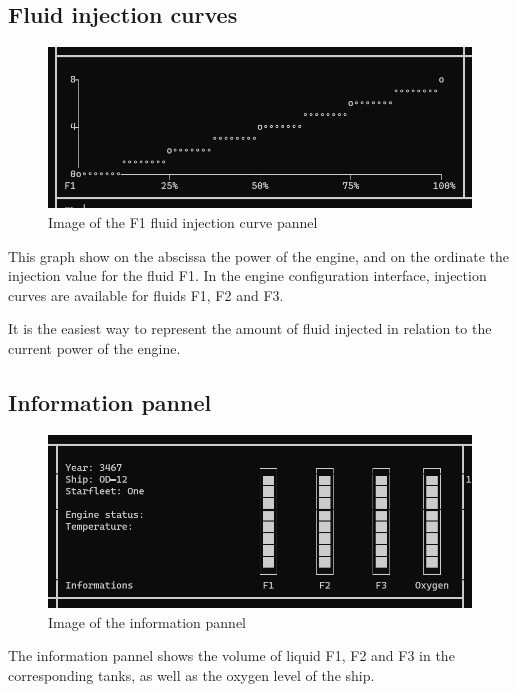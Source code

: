 \documentclass[12pt]{article}
\begin{document}
\newpage
\subsection{Fluid injection curves}
\begin{figure}[!htb]
    \center\includegraphics[width=\linewidth]{images/injection_curve.png}
    \caption{Image of the F1 fluid injection curve pannel}
\end{figure}

This graph show on the abscissa the power of the engine, and on the ordinate the injection value for the fluid F1.
In the engine configuration interface, injection curves are available for fluids F1, F2 and F3.

It is the easiest way to represent the amount of fluid injected in relation to the current power of the engine.

\subsection{Information pannel}
\begin{figure}[!htb]
    \center\includegraphics[width=\linewidth]{images/information_pannel.png}
    \caption{Image of the information pannel}
\end{figure}

The information pannel shows the volume of liquid F1, F2 and F3 in the corresponding tanks, as well as the oxygen level of the ship.

\newpage
\end{document}
